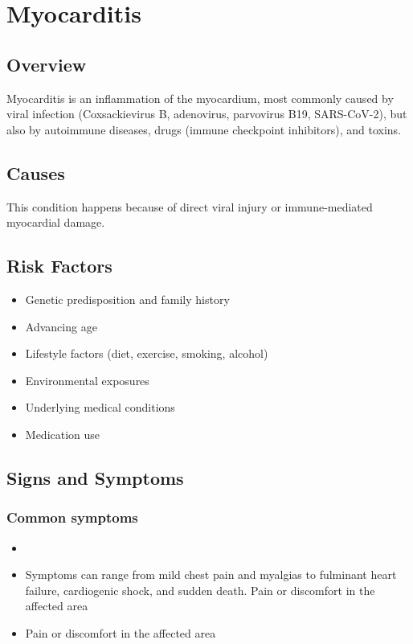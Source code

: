 \chapter{Myocarditis}
\label{sec:Myocarditis}

\section{Overview}
Myocarditis is an inflammation of the myocardium, most commonly caused by viral infection (Coxsackievirus B, adenovirus, parvovirus B19, SARS-CoV-2), but also by autoimmune diseases, drugs (immune checkpoint inhibitors), and toxins.
\section{Causes}
This condition happens because of direct viral injury or immune-mediated myocardial damage.     
\section{Risk Factors}

\begin{itemize}[noitemsep]
  \item Genetic predisposition and family history
  \item Advancing age
  \item Lifestyle factors (diet, exercise, smoking, alcohol)
  \item Environmental exposures
  \item Underlying medical conditions
  \item Medication use
\end{itemize}
\section{Signs and Symptoms}

\subsection{Common symptoms}
\begin{itemize}[noitemsep]
  \item \item Symptoms can range from mild chest pain and myalgias to fulminant heart failure, cardiogenic shock, and sudden death. Pain or discomfort in the affected area    \item Pain or discomfort in the affected area
  \end{itemize}

